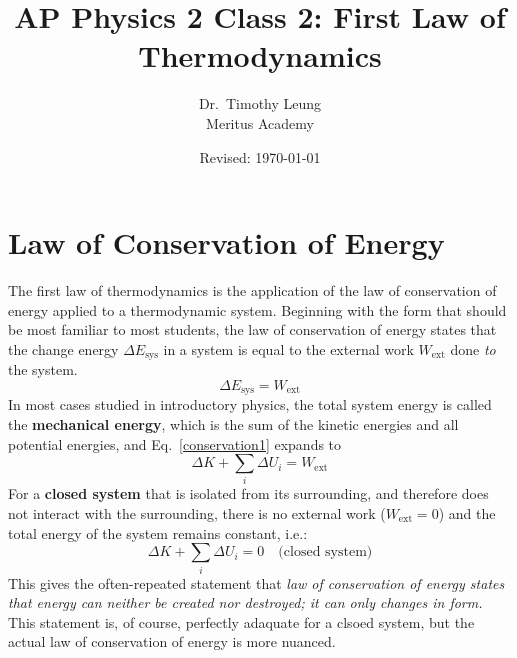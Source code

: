 \documentclass[11pt]{article}
\title{AP Physics 2 Class 2: First Law of Thermodynamics}
\author{Dr.\ Timothy Leung\\Meritus Academy}
\date{Revised: \today}
\begin{document}
\maketitle

\section{Law of Conservation of Energy}
The first law of thermodynamics is the application of the law of conservation
of energy applied to a thermodynamic system. Beginning with the form that should
be most familiar to most students, the law of conservation of energy states that
the change energy $\Delta E_\text{sys}$ in a system is equal to the external work
$W_\text{ext}$ done \emph{to} the system.
\begin{equation}
  \boxed{ \Delta E_\text{sys} = W_\text{ext}}
  \label{conservation1}
\end{equation}
In most cases studied in introductory physics, the total system energy is called
the \textbf{mechanical energy}, which is the sum of
the kinetic energies and all potential energies, and Eq.~\ref{conservation1}
expands to
\begin{equation}
  \boxed{ \Delta K + \sum_i\Delta U_i = W_\text{ext}}
  \label{conservation2}
\end{equation}
For a \textbf{closed system} that is isolated from its surrounding, and
therefore does not interact with the surrounding, there is no external work
($W_\text{ext}=0$) and the total energy of the system remains constant, i.e.:
\begin{equation}
  \Delta K + \sum_i\Delta U_i = 0\quad\text{(closed system)}
  \label{isolate1}
\end{equation}
This gives the often-repeated statement that \emph{law of conservation of
  energy states that energy can neither be created nor destroyed; it can only
  changes in form.} This statement is, of course, perfectly adaquate for a
clsoed system, but the actual law of conservation of energy is more nuanced.
\end{document}
